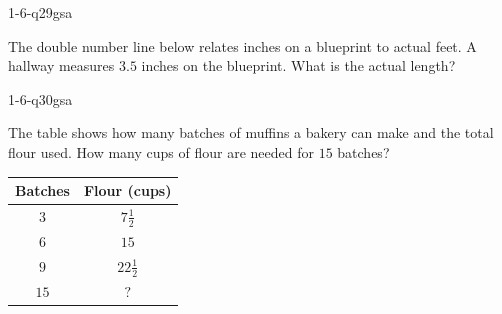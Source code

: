 \begin{practiceQuestion}{1-6-q29}{gsa}
\begin{questionText}
The double number line below relates inches on a blueprint to actual feet. A hallway measures $3.5$ inches on the blueprint. What is the actual length?

\begin{center}
\end{center}
\end{questionText}
\end{practiceQuestion}

\begin{practiceQuestion}{1-6-q30}{gsa}
\begin{questionText}
The table shows how many batches of muffins a bakery can make and the total flour used. How many cups of flour are needed for $15$ batches?

\begin{center}
\begin{tabular}{|c|c|}
\hline
\textbf{Batches} & \textbf{Flour (cups)} \\ \hline
$3$ & $7\frac{1}{2}$ \\ \hline
$6$ & $15$ \\ \hline
$9$ & $22\frac{1}{2}$ \\ \hline
$15$ & $?$ \\ \hline
\end{tabular}
\end{center}
\end{questionText}
\end{practiceQuestion}

